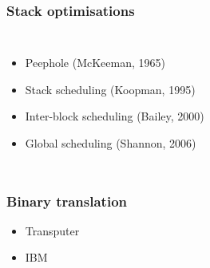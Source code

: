 \documentclass{beamer}
\begin{document}
\begin{frame}[fragile]
  \frametitle{Stack optimisations}
  \begin{columns}
    \begin{itemize}
      \item<1-> Peephole (McKeeman, 1965)
      \item<2-> Stack scheduling (Koopman, 1995)
      \item<3-> Inter-block scheduling (Bailey, 2000)
      \item<4-> Global scheduling (Shannon, 2006)
    \end{itemize}
  \end{columns}
\end{frame}

\begin{frame}
  \frametitle{Binary translation}
  \begin{itemize}
    \item Transputer
    \item IBM
  \end{itemize}
\end{frame}
\end{document}
